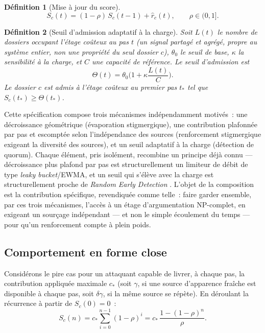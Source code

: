\documentclass[11pt]{article}
\newtheorem{definition}{Définition}
\begin{document}
\begin{definition}[Mise à jour du score]
\[
S_c(t) = (1-\rho)\, S_c(t-1) + \hat r_c(t), \qquad \rho \in (0,1].
\]
\end{definition}

\begin{definition}[Seuil d'admission adaptatif à la charge]
Soit $L(t)$ le nombre de dossiers occupant l'étage coûteux au pas $t$ (un
signal partagé et agrégé, propre au système entier, non une propriété du
seul dossier $c$), $\theta_0$ le seuil de base, $\kappa$ la sensibilité à
la charge, et $C$ une capacité de référence. Le seuil d'admission est
\[
\Theta(t) = \theta_0 \Big(1 + \kappa \frac{L(t)}{C}\Big).
\]
Le dossier $c$ est admis à l'étage coûteux au premier pas $t_{\ast}$ tel
que $S_c(t_{\ast}) \geq \Theta(t_{\ast})$.
\end{definition}

Cette spécification compose trois mécanismes indépendamment motivés~: une
décroissance géométrique (évaporation stigmergique), une contribution
plafonnée par pas et escomptée selon l'indépendance des sources
(renforcement stigmergique exigeant la diversité des sources), et un
seuil adaptatif à la charge (détection de quorum). Chaque élément, pris
isolément, recombine un principe déjà connu --- décroissance plus
plafond par pas est structurellement un limiteur de débit de type
\emph{leaky bucket}/EWMA, et un seuil qui s'élève avec la charge est
structurellement proche de \emph{Random Early Detection}
\cite{floyd1993}. L'objet de la composition est la contribution
spécifique, revendiquée comme telle~: faire garder ensemble, par ces
trois mécanismes, l'accès à un étage d'argumentation NP-complet, en
exigeant un sourçage indépendant --- et non le simple écoulement du
temps --- pour qu'un renforcement compte à plein poids.

\subsection{Comportement en forme close}

Considérons le pire cas pour un attaquant capable de livrer, à chaque
pas, la contribution appliquée maximale $c_{\ast}$ (soit $\gamma$, si une
source d'apparence fraîche est disponible à chaque pas, soit
$\delta\gamma$, si la même source se répète). En déroulant la récurrence
à partir de $S_c(0) = 0$~:
\[
S_c(n) = c_{\ast} \sum_{i=0}^{n-1} (1-\rho)^i = c_{\ast}\,\frac{1-(1-\rho)^n}{\rho}.
\]
\end{document}
